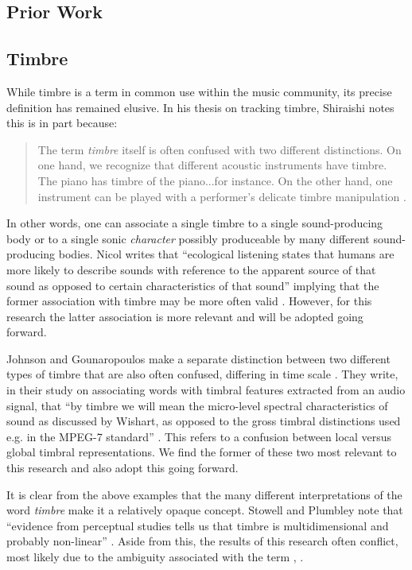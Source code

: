\documentclass[a4paper,12pt]{report} 	%
\numberwithin{figure}{chapter}
\numberwithin{table}{chapter}
\numberwithin{equation}{chapter}
\begin{document}
\begin{flushleft}
\vspace*{\QuarterPage}
\chapter{Prior Work} %
\section{Timbre}
While timbre is a term in common use within the music community, its precise definition has remained elusive. In his thesis on tracking timbre, Shiraishi notes this is in part because:

\selectfont
\begin{quote}
The term \emph{timbre} itself is often confused with two different distinctions. On one hand, we recognize that different acoustic instruments have timbre. The piano has timbre of the piano...for instance. On the other hand, one instrument can be played with a performer's delicate timbre manipulation \cite[p. 4]{Shiraishi:2006ye}.
\end{quote}
\selectfont
In other words, one can associate a single timbre to a single sound-producing body or to a single sonic \emph{character} possibly produceable by many different sound-producing bodies. Nicol writes that ``ecological listening states that humans are more likely to describe sounds with reference to the apparent source of that sound as opposed to certain characteristics of that sound'' implying that the former association with timbre may be more often valid \cite[p. 23]{Nicol:2005rp}. However, for this research the latter association is more relevant and will be adopted going forward. 

Johnson and Gounaropoulos make a separate distinction between two different types of timbre that are also often confused, differing in time scale \cite{Johnson:2006pi}. They write, in their study on associating words with timbral features extracted from an audio signal, that ``by timbre we will mean the micro-level spectral characteristics of sound as discussed by Wishart, as opposed to the gross timbral distinctions used e.g. in the MPEG-7 standard'' \cite[p. 1]{Johnson:2006pi}. This refers to a confusion between local versus global timbral representations. We find the former of these two most relevant to this research and also adopt this going forward.

It is clear from the above examples that the many different interpretations of the word \emph{timbre} make it a relatively opaque concept. Stowell and Plumbley note that ``evidence from perceptual studies tells us that timbre is multidimensional and probably non-linear'' \cite[p. 1]{Stowell:2008qf}. Aside from this, the results of this research often conflict, most likely due to the ambiguity associated with the term \cite[p. 4]{Fiebrink:os}, \cite[p. 11]{Ciglar:2009uf}.


\end{flushleft}
\end{document}
